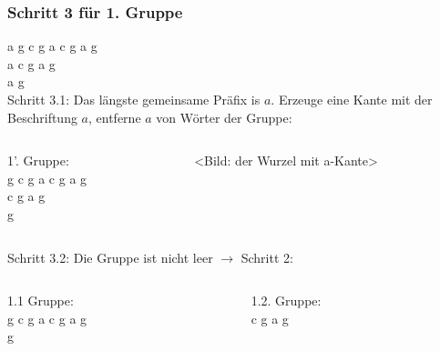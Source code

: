 \documentclass{beamer}
\begin{document}

\begin{frame}[t]
\frametitle{Schritt 3 für 1. Gruppe}
    a g c g a c g a g   \\
    a c g a g           \\
    a g                 \\
    \medskip
    Schritt 3.1: Das längste gemeinsame Präfix is $a$. Erzeuge eine Kante mit der Beschriftung $a$, entferne $a$ von Wörter der Gruppe:
    \medskip
    \begin{columns}
    \begin{column}[t]{0.3\textwidth}
        1'. Gruppe:     \\
        g c g a c g a g \\
        c g a g         \\
        g               \\
    \end{column}
    \begin{column}[t]{0.3\textwidth}
        <Bild: der Wurzel mit a-Kante>
    \end{column}
\end{columns}
    \medskip
    Schritt 3.2: Die Gruppe ist nicht leer $\rightarrow$ Schritt 2:
    \begin{columns}
    \begin{column}[t]{0.3\textwidth}
        1.1 Gruppe:     \\
        g c g a c g a g \\
        g               \\
    \end{column}
    \begin{column}[t]{0.3\textwidth}
        1.2. Gruppe:    \\
        c g a g         \\
    \end{column}
\end{columns}
\end{frame}

\end{document}
